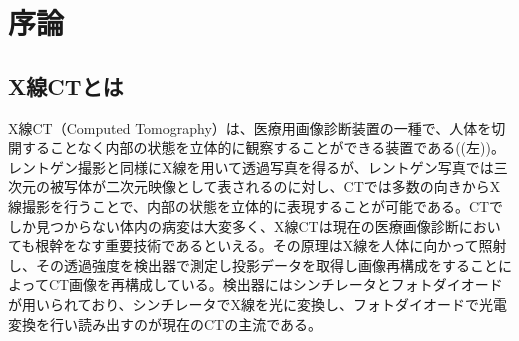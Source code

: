 \chapter{序論}

\section{X線CTとは}
X線CT（Computed Tomography）は、医療用画像診断装置の一種で、人体を切開することなく内部の状態を立体的に観察することができる装置である((左))。レントゲン撮影と同様にX線を用いて透過写真を得るが、レントゲン写真では三次元の被写体が二次元映像として表されるのに対し、CTでは多数の向きからX線撮影を行うことで、内部の状態を立体的に表現することが可能である。CTでしか見つからない体内の病変は大変多く、X線CTは現在の医療画像診断においても根幹をなす重要技術であるといえる。その原理はX線を人体に向かって照射し、その透過強度を検出器で測定し投影データを取得し画像再構成をすることによってCT画像を再構成している。検出器にはシンチレータとフォトダイオードが用いられており、シンチレータでX線を光に変換し、フォトダイオードで光電変換を行い読み出すのが現在のCTの主流である。
\vspace{0.5cm}
